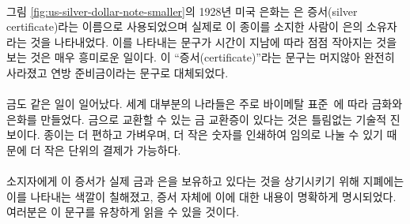 \paragraph{}
\begin{comment}
	Note that the 1928 U.S. silver dollar in
	Figure~\ref{fig:us-silver-dollar-note-smaller} still goes by the name of
	\textit{silver certificate}, indicating that this is indeed simply a document
	stating that the bearer of this piece of paper is owed a piece of silver. It is
	interesting to see that the text which indicates this got smaller over time. The
	trace of \enquote{certificate} vanished completely after a while, being replaced
	by the reassuring statement that these are federal reserve notes.
\end{comment}
그림 \ref{fig:us-silver-dollar-note-smaller}의 1928년 미국 은화는 은 증서(silver certificate)라는
이름으로 사용되었으며 실제로 이 종이를 소지한 사람이 은의 소유자라는 것을 나타내었다. 
이를 나타내는 문구가 시간이 지남에 따라 점점 작아지는 것을 보는 것은 매우 흥미로운 일이다. 
이 \enquote{증서(certificate)}라는 문구는 머지않아 완전히 사라졌고 연방 준비금이라는 문구로 대체되었다.

\paragraph{}
\begin{comment}
	As mentioned above, the same thing happened to gold. Most of the world was on a
	bimetallic standard~\cite{wiki:bimetallism}, meaning coins were made
	primarily of gold and silver. Having certificates for gold, redeemable in gold
	coins, was arguably a technological improvement. Paper is more convenient,
	lighter, and since it can be divided arbitrarily by simply printing a smaller
	number on it, it is easier to break into smaller units.
\end{comment}
금도 같은 일이 일어났다. 
세계 대부분의 나라들은 주로 바이메탈 표준~\cite{wiki:bimetallism}에 따라 금화와 은화를 만들었다. 
금으로 교환할 수 있는 금 교환증이 있다는 것은 틀림없는 기술적 진보이다.
종이는 더 편하고 가벼우며, 더 작은 숫자를 인쇄하여 임의로 나눌 수 있기 때문에 더 작은 단위의 결제가
가능하다.

\paragraph{}
\begin{comment}
	To remind the bearers (users) that these certificates were
	representative for actual gold and silver, they were colored accordingly
	and stated this clearly on the certificate itself. You can fluently read
	the writing from top to bottom:
\end{comment}
소지자에게 이 증서가 실제 금과 은을 보유하고 있다는 것을 상기시키기 위해 지폐에는 이를 나타내는 색깔이 칠해졌고, 
증서 자체에 이에 대한 내용이 명확하게 명시되었다. 여러분은 이 문구를 유창하게 읽을 수 있을 것이다.

